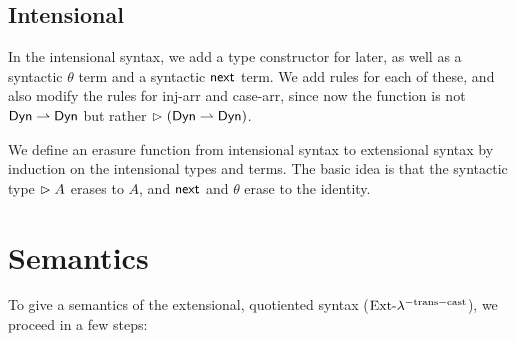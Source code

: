 \documentclass{article}
\begin{document}



    \subsection{Intensional}
    In the intensional syntax, we add a type constructor for later, as well as a
    syntactic $\theta$ term and a syntactic $\mathsf{next}$ term.
    We add rules for each of these, and also modify the rules for inj-arr and
    case-arr, since now
    the function is not $\mathsf{Dyn} \rightharpoonup \mathsf{Dyn}$ but rather $\vartriangleright (\mathsf{Dyn} \rightharpoonup \mathsf{Dyn})$.


    We define an erasure function from intensional syntax to extensional syntax
    by induction on the intensional types and terms.
    The basic idea is that the syntactic type $\vartriangleright A$ erases to $A$,
    and $\mathsf{next}$ and $\theta$ erase to the identity.

    


\section{Semantics}
To give a semantics of the extensional, quotiented syntax ($\text{Ext-}\lambda^{-\text{trans}-\text{cast}}$), we proceed
in a few steps:
\end{document}
